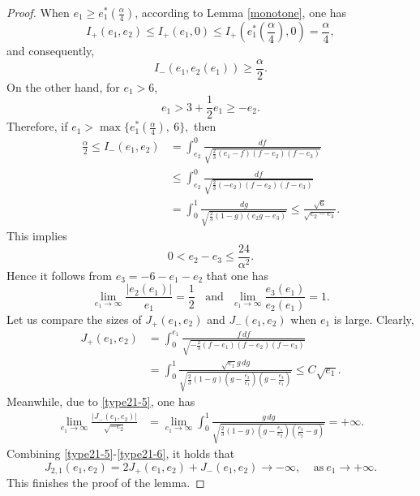 \documentclass[reqno,12pt]{amsart}
\begin{document}
{\begin{proof} 
When $e_1 \geq  e_1^*(\frac{\alpha}{4})$, according to Lemma \ref{monotone},  one has
\begin{equation*}
    I_{+}(e_1, e_2)\leq I_{+}(e_1, 0) \leq I_{+}\left(e_1^*\left(\frac{\alpha}{4}\right), 0\right)= \frac{\alpha}{4}, 
\end{equation*}
and consequently, 
\begin{equation*}
   I_{-}(e_1, e_2(e_1)) \geq \frac{\alpha}{2}. 
\end{equation*}
On the other hand, for $e_1 > 6$, 
\begin{equation}\nonumber
    e_1 > 3+ \frac12 e_1 \geq - e_2.
\end{equation}
Therefore, if $e_1 > \max\{ e_1^*(\frac{\alpha}{4}), \ 6\}, $ then 
\begin{align*}
    \frac{\alpha}{2} \leq I_{-}(e_1, e_2) & = \int_{e_2}^0 \frac{df}{\sqrt{\frac23(e_1 - f)(f-e_2) (f-e_3)}} \\
    & \leq \int_{e_2}^0 \frac{df}{\sqrt{\frac23 (-e_2) (f -e_2) (f-e_3)}}\\
    & = \int_0^1 \frac{dg}{\sqrt{\frac23 (1-g) (e_2 g - e_3)}} \leq \frac{\sqrt{6}}{\sqrt{e_2 -e_3}}. 
\end{align*}
This implies
\begin{equation}\nonumber
    0<e_2 - e_3 \leq \frac{24}{\alpha^2}. 
\end{equation}
Hence it follows from $e_3=-6-e_1-e_2$ that one has
\begin{equation}\label{type21-5}
    \lim_{e_1\to \infty}\frac{|e_2(e_1)|}{e_1} =\frac12 \ \ \  \ \mbox{and}\ \ \ \lim_{e_1\to \infty} \frac{e_3(e_1)}{e_2(e_1)}= 1.  
\end{equation}
Let us compare the sizes of $J_{+}(e_1, e_2)$ and $J_{-}(e_1, e_2)$ when $e_1$ is large. Clearly,
\begin{align*}
    J_{+}(e_1, e_2)& = \int_{0}^{e_1} \frac{f\, df}{\sqrt{-\frac23 (f -e_1)(f-e_2)(f-e_3)}}  \\
    & = \int_0^1 \frac{\sqrt{e_1} g\, dg}
    {\sqrt{\frac23 (1-g) ( g- \frac{e_2}{e_1}) ( g - \frac{e_3}{e_1})}} \leq C \sqrt{e_1}. 
\end{align*}
Meanwhile, due to \eqref{type21-5}, one has
\begin{align}\label{type21-6}
   \lim_{e_1 \to \infty} \frac{ |J_{-}(e_1, e_2)| }{\sqrt{-e_2}} & = \lim_{e_1 \to \infty} \int_0^1 \frac{g \, dg }{\sqrt{\frac23 (1-g) (g-\frac{e_1}{e_2}) (\frac{e_3}{e_2}- g)}} = +\infty. 
\end{align}
Combining  \eqref{type21-5}-\eqref{type21-6}, 
it holds that 
\begin{equation}\label{eq:negainf}
J_{2, 1}(e_1, e_2) = 2J_{+}(e_1, e_2) + J_{-}(e_1, e_2)\to -\infty, \ \ \ \ \ \mbox{as}\ e_1\to +\infty. 
 \end{equation}
 This finishes the proof of the lemma.
 \end{proof}
 
}
\end{document}
